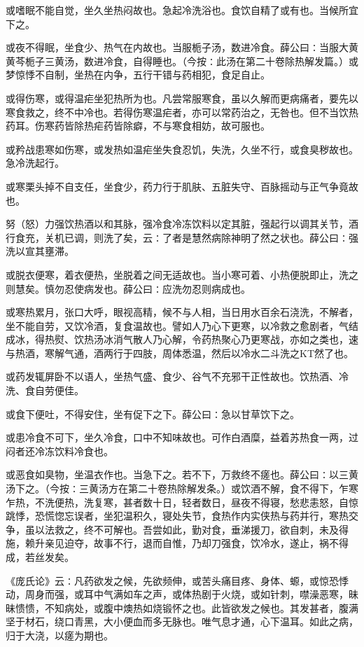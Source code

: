 \documentclass[a4paper,12pt,UTF8,twoside]{ctexbook}
\begin{document}
或嗜眠不能自觉，坐久坐热闷故也。急起冷洗浴也。食饮自精了或有也。当候所宜下之。

或夜不得眠，坐食少、热气在内故也。当服栀子汤，数进冷食。薛公曰∶当服大黄黄芩栀子三黄汤，数进冷食，自得睡也。（今按∶此汤在第二十卷除热解发篇。）或梦惊悸不自制，坐热在内争，五行干错与药相犯，食足自止。

或得伤寒，或得温疟坐犯热所为也。凡尝常服寒食，虽以久解而更病痛者，要先以寒食救之，终不中冷也。若得伤寒温疟者，亦可以常药治之，无咎也。但不当饮热药耳。伤寒药皆除热疟药皆除癖，不与寒食相妨，故可服也。

或矜战患寒如伤寒，或发热如温疟坐失食忍饥，失洗，久坐不行，或食臭秽故也。急冷洗起行。

或寒栗头掉不自支任，坐食少，药力行于肌肤、五脏失守、百脉摇动与正气争竟故也。

努（怒）力强饮热酒以和其脉，强冷食冷冻饮料以定其脏，强起行以调其关节，酒行食充，关机已调，则洗了矣，云∶了者是慧然病除神明了然之状也。薛公曰∶强洗以宣其壅滞。

或脱衣便寒，着衣便热，坐脱着之间无适故也。当小寒可着、小热便脱即止，洗之则慧矣。慎勿忍使病发也。薛公曰∶应洗勿忍则病成也。

或寒热累月，张口大呼，眼视高精，候不与人相，当日用水百余石浇洗，不解者，坐不能自劳，又饮冷酒，复食温故也。譬如人乃心下更寒，以冷救之愈剧者，气结成冰，得热熨、饮热汤冰消气散人乃心解，令药热聚心乃更寒战，亦如之类也，速与热酒，寒解气通，酒两行于四肢，周体悉温，然后以冷水二斗洗之KT然了也。

或药发辄屏卧不以语人，坐热气盛、食少、谷气不充邪干正性故也。饮热酒、冷洗、食自劳便佳。

或食下便吐，不得安住，坐有促下之下。薛公曰∶急以甘草饮下之。

或患冷食不可下，坐久冷食，口中不知味故也。可作白酒糜，益着苏热食一两，过闷者还冷冻饮料冷食也。

或恶食如臭物，坐温衣作也。当急下之。若不下，万救终不瘥也。薛公曰∶以三黄汤下之。（今按∶三黄汤方在第二十卷热除解发条。）或饮酒不解，食不得下，乍寒乍热，不洗便热，洗复寒，甚者数十日，轻者数日，昼夜不得寝，愁悲恚怒，自惊跳悸，恐慌惚忘误者，坐犯温积久，寝处失节，食热作内实侠热与药并行，寒热交争，虽以法救之，终不可解也。吾尝如此，勤对食，垂涕援刀，欲自刺，未及得施，赖升亲见迫夺，故事不行，退而自惟，乃却刀强食，饮冷水，遂止，祸不得成，若丝发矣。

《庞氏论》云∶凡药欲发之候，先欲频伸，或苦头痛目疼、身体、螈，或惊恐悸动，周身而强，或耳中气满如车之声，或体热剧于火烧，或如针刺，噤澡恶寒，昧昧愦愦，不知病处，或腹中燠热如烧锻怀之也。此皆欲发之候也。其发甚者，腹满坚于材石，绕口青黑，大小便血而多无脉也。唯气息才通，心下温耳。如此之病，归于大浇，以瘥为期也。
\end{document}
